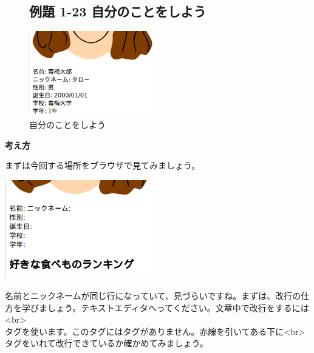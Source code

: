 \clearpage

\centering
\begin{figure}
  \subsection{例題 1-23 自分のことをしよう}
  \centering
  \begin{minipage}{\textwidth}
    \includegraphics[width=0.5\textwidth]{text01-img/textbook-img173.png}
    \caption{自分のことをしよう}
  \end{minipage}    
\end{figure}

\bigskip

\flushleft

\textbf{考え方}


\bigskip

まずは今回する場所をブラウザで見てみましょう。

\includegraphics[width=0.5\textwidth]{text01-img/textbook-img175.png}

\bigskip

\flushleft
名前とニックネームが同じ行になっていて、見づらいですね。まずは、改行の仕方を学びましょう。テキストエディタへってください。文章中で改行をするには\\
{\textless}br{\textgreater} \ \ \ \ \ \\
タグを使います。このタグにはタグがありません。赤線を引いてある下に{\textless}br{\textgreater}タグをいれて改行できているか確かめてみましょう。


